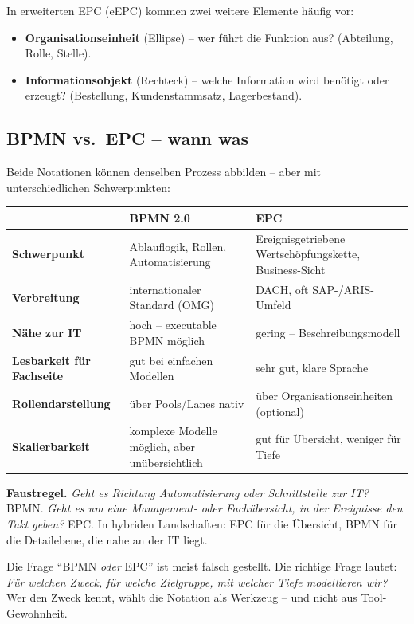 \documentclass[11pt,a4paper,oneside]{article}
\newcommand{\fachbegriff}[1]{\textbf{#1}}
\begin{document}
In erweiterten EPC (eEPC) kommen zwei weitere Elemente häufig vor:

\begin{itemize}
  \item \fachbegriff{Organisationseinheit} (Ellipse) -- wer führt die Funktion aus? (Abteilung, Rolle, Stelle).
  \item \fachbegriff{Informationsobjekt} (Rechteck) -- welche Information wird benötigt oder erzeugt? (Bestellung, Kundenstammsatz, Lagerbestand).
\end{itemize}

\subsection{BPMN vs.\ EPC -- wann was}

Beide Notationen können denselben Prozess abbilden -- aber mit unterschiedlichen Schwerpunkten:

\begin{tabularx}{\linewidth}{@{}l X X@{}}
\toprule
& \textbf{BPMN 2.0} & \textbf{EPC} \\
\midrule
\textbf{Schwerpunkt} & Ablauflogik, Rollen, Automatisierung & Ereignisgetriebene Wertschöpfungskette, Business-Sicht \\
\textbf{Verbreitung} & internationaler Standard (OMG) & DACH, oft SAP-/ARIS-Umfeld \\
\textbf{Nähe zur IT} & hoch -- executable BPMN möglich & gering -- Beschreibungsmodell \\
\textbf{Lesbarkeit für Fachseite} & gut bei einfachen Modellen & sehr gut, klare Sprache \\
\textbf{Rollendarstellung} & über Pools/Lanes nativ & über Organisationseinheiten (optional) \\
\textbf{Skalierbarkeit} & komplexe Modelle möglich, aber unübersichtlich & gut für Übersicht, weniger für Tiefe \\
\bottomrule
\end{tabularx}

\medskip

\noindent\textbf{Faustregel.} \emph{Geht es Richtung Automatisierung oder Schnittstelle zur IT?} \textrightarrow{} BPMN. \emph{Geht es um eine Management- oder Fachübersicht, in der Ereignisse den Takt geben?} \textrightarrow{} EPC. In hybriden Landschaften: EPC für die Übersicht, BPMN für die Detailebene, die nahe an der IT liegt.

\begin{merkbox}
Die Frage ``BPMN \emph{oder} EPC'' ist meist falsch gestellt. Die richtige Frage lautet: \emph{Für welchen Zweck, für welche Zielgruppe, mit welcher Tiefe modellieren wir?} Wer den Zweck kennt, wählt die Notation als Werkzeug -- und nicht aus Tool-Gewohnheit.
\end{merkbox}
\end{document}
